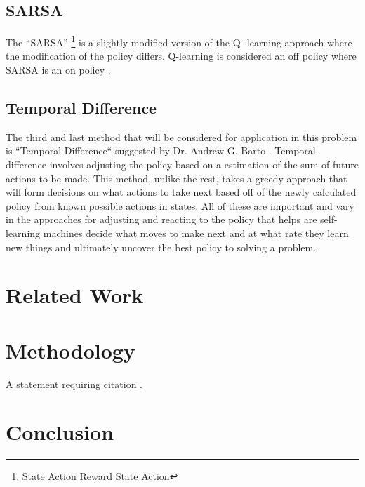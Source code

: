 \documentclass[twoside,twocolumn]{article}
\begin{document}

\subsection{SARSA}

\indent The “SARSA” \footnote{State Action Reward State Action} is a slightly modified version of the Q -learning approach where the modification of the policy differs. Q-learning is considered an off policy where SARSA is an on policy \cite{GeeksforGeeks:2021dg}. 


\subsection{Temporal Difference}

The third and last method that will be considered for application in this problem is “Temporal Difference“ suggested by Dr. Andrew G. Barto \cite{sutton:2018}.  Temporal difference involves adjusting the policy based on a estimation of the sum of future actions to be made.  This method, unlike the rest, takes a greedy approach that will form decisions on what actions to take next based off of the newly calculated policy from known possible actions in states.  All of these are important and vary in the approaches for adjusting and reacting to the policy that helps are self-learning machines decide what moves to make next and at what rate they learn new things and ultimately uncover the best policy to solving a problem. 


\section{Related Work}


\section{Methodology}

A statement requiring citation \cite{Figueredo:2009dg}.


\section{Conclusion}
\end{document}
